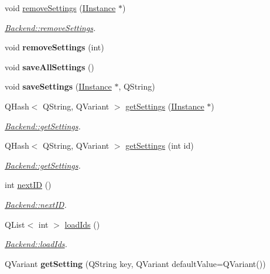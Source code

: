 \begin{DoxyCompactItemize}
\item 
void \hyperlink{classBackend_afcbcbf35d3678dc95de1acee4a8b4307}{remove\+Settings} (\hyperlink{classInstances_1_1IInstance}{I\+Instance} $\ast$)
\begin{DoxyCompactList}\small\item\em \hyperlink{classBackend_afcbcbf35d3678dc95de1acee4a8b4307}{Backend\+::remove\+Settings}. \end{DoxyCompactList}\item 
\hypertarget{classBackend_a1681e99e726bde1078b2f923344d6c19}{void {\bfseries remove\+Settings} (int)}\label{classBackend_a1681e99e726bde1078b2f923344d6c19}

\item 
\hypertarget{classBackend_a393c2f03c7b2842a2f33af1d37936a8b}{void {\bfseries save\+All\+Settings} ()}\label{classBackend_a393c2f03c7b2842a2f33af1d37936a8b}

\item 
\hypertarget{classBackend_a103ebcb39d6c6857a10975cb8f135f89}{void {\bfseries save\+Settings} (\hyperlink{classInstances_1_1IInstance}{I\+Instance} $\ast$, Q\+String)}\label{classBackend_a103ebcb39d6c6857a10975cb8f135f89}

\item 
Q\+Hash$<$ Q\+String, Q\+Variant $>$ \hyperlink{classBackend_afb078e1c344aef87c53c079411003536}{get\+Settings} (\hyperlink{classInstances_1_1IInstance}{I\+Instance} $\ast$)
\begin{DoxyCompactList}\small\item\em \hyperlink{classBackend_afb078e1c344aef87c53c079411003536}{Backend\+::get\+Settings}. \end{DoxyCompactList}\item 
Q\+Hash$<$ Q\+String, Q\+Variant $>$ \hyperlink{classBackend_a57e1f06d09bb993d693c2287c0f8e525}{get\+Settings} (int id)
\begin{DoxyCompactList}\small\item\em \hyperlink{classBackend_afb078e1c344aef87c53c079411003536}{Backend\+::get\+Settings}. \end{DoxyCompactList}\item 
int \hyperlink{classBackend_a32ac5490f4f303e2a14ffdf3788f347d}{next\+I\+D} ()
\begin{DoxyCompactList}\small\item\em \hyperlink{classBackend_a32ac5490f4f303e2a14ffdf3788f347d}{Backend\+::next\+I\+D}. \end{DoxyCompactList}\item 
Q\+List$<$ int $>$ \hyperlink{classBackend_a2a77d2660fe12daa1d277181efbfb110}{load\+Ids} ()
\begin{DoxyCompactList}\small\item\em \hyperlink{classBackend_a2a77d2660fe12daa1d277181efbfb110}{Backend\+::load\+Ids}. \end{DoxyCompactList}\item 
\hypertarget{classBackend_a49aa08ee70e290fddb85aef0f3fc5c66}{Q\+Variant {\bfseries get\+Setting} (Q\+String key, Q\+Variant default\+Value=Q\+Variant())}\label{classBackend_a49aa08ee70e290fddb85aef0f3fc5c66}

\end{DoxyCompactItemize}
